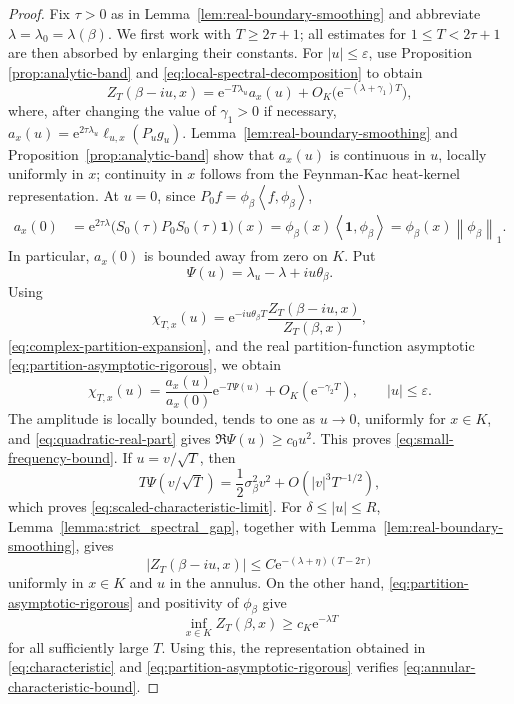 \documentclass[11pt,reqno]{amsart}
\theoremstyle{definition}
\numberwithin{equation}{section}
\newcommand{\<}{\langle}
\renewcommand{\>}{\rangle}
\def\lt{\left}
\def\rt{\right}
\newcommand{\norm}[1]{{\lt\|#1\rt\|}}
\newcommand{\ip}[2]{\left\langle #1,#2\right\rangle}
\begin{document}
\begin{proof}
Fix $\tau>0$ as in Lemma~\ref{lem:real-boundary-smoothing} and abbreviate $\lambda=\lambda_0=\lambda(\beta)$.  We first work with
$T\geq2\tau+1$; all estimates for $1\leq T<2\tau+1$ are then absorbed by
enlarging their constants.  For
$|u|\leq\varepsilon$, use Proposition \ref{prop:analytic-band}
and
\eqref{eq:local-spectral-decomposition} to obtain
\begin{equation}
 Z_T(\beta-iu,x)
 =\mathrm e^{-T\lambda_u}a_x(u)
  +O_K\bigl(\mathrm e^{-(\lambda+\gamma_1)T}\bigr),
 \label{eq:complex-partition-expansion}
\end{equation}
where, after changing the value of $\gamma_1>0$ if necessary,
 $a_x(u)
 = \mathrm e^{2\tau\lambda_u}\ell_{u,x}(P_ug_u)$.
Lemma~\ref{lem:real-boundary-smoothing} and
Proposition~\ref{prop:analytic-band} show that $a_x(u)$ is continuous in
$u$, locally uniformly in $x$; continuity in $x$ follows from the
Feynman-Kac heat-kernel representation.  At $u=0$, since
$P_0f=\phi_\beta\ip{f}{\phi_\beta}$,
\begin{align*}
 a_x(0)
 &=\mathrm  e^{2\tau\lambda}
   \bigl(S_0(\tau)P_0S_0(\tau)\mathbf 1\bigr)(x)
 =\phi_\beta(x)\ip{\mathbf 1}{\phi_\beta}
 =\phi_\beta(x)\norm{\phi_\beta}_1.
\end{align*}
In particular, $a_x(0)$ is bounded away from zero on $K$.
Put
\[
 \Psi(u)=\lambda_u-\lambda+iu\theta_\beta.
\]
Using 
\begin{equation}
 \chi_{T,x}(u)
 =\mathrm e^{-iu\theta_\beta T}
  \frac{Z_T(\beta-iu,x)}{Z_T(\beta,x)},
 \label{eq:characteristic}
\end{equation}
\eqref{eq:complex-partition-expansion}, and the real partition-function
asymptotic \eqref{eq:partition-asymptotic-rigorous}, we obtain
\begin{equation}
 \chi_{T,x}(u)
 =\frac{a_x(u)}{a_x(0)}\mathrm e^{-T\Psi(u)}
  +O_K(\mathrm e^{-\gamma_2T}),
 \qquad |u|\leq\varepsilon.
 \nonumber
\end{equation}
The amplitude is locally bounded, tends to one as $u\to0$, uniformly for
$x\in K$, and \eqref{eq:quadratic-real-part} gives
$\Re\Psi(u)\geq c_0u^2$.  This proves
\eqref{eq:small-frequency-bound}.  If $u=v/\sqrt T$, then
\[
 T\Psi(v/\sqrt T)
 =\frac12\sigma_\beta^2v^2+O(|v|^3T^{-1/2}),
\]
which proves \eqref{eq:scaled-characteristic-limit}.
For $\delta\leq|u|\leq R$, Lemma~\ref{lemma:strict_spectral_gap}, together with Lemma~\ref{lem:real-boundary-smoothing},
 gives
\[
 |Z_T(\beta-iu,x)|
 \leq C \mathrm e^{-(\lambda+\eta)(T-2\tau)}
\]
uniformly in $x\in K$ and $u$ in the annulus.  On the other hand,
\eqref{eq:partition-asymptotic-rigorous} and positivity of $\phi_\beta$ give
\[
 \inf_{x\in K}Z_T(\beta,x)
 \geq c_K \mathrm e^{-\lambda T}
\]
for all sufficiently large $T$.  Using this, the representation obtained in \eqref{eq:characteristic} and  \eqref{eq:partition-asymptotic-rigorous}
verifies
\eqref{eq:annular-characteristic-bound}.
\end{proof}
\end{document}
